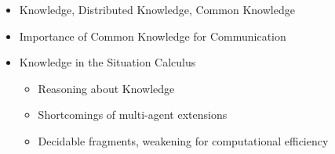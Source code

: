 \begin{itemize}
\item Knowledge, Distributed Knowledge, Common Knowledge
\item Importance of Common Knowledge for Communication
\item Knowledge in the Situation Calculus
  \begin{itemize}
  \item Reasoning about Knowledge
  \item Shortcomings of multi-agent extensions
  \item Decidable fragments, weakening for computational efficiency
  \end{itemize}
\end{itemize}

